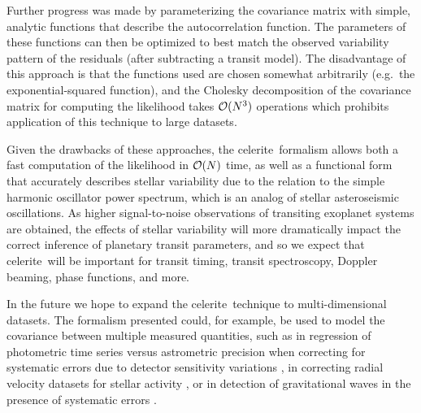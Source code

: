 \documentclass[manuscript, letterpaper]{aastex6}
\newcommand{\project}[1]{\textsf{#1}}
\newcommand{\celerite}{\project{celerite}}
\begin{document}
Further progress was made by parameterizing the covariance matrix with simple,
analytic functions that describe the autocorrelation function.  The parameters
of these functions can then be optimized to best match the observed variability
pattern of the residuals (after subtracting a transit model).  The disadvantage of
this approach is that the functions used are chosen somewhat arbitrarily (e.g.\
the exponential-squared function), and the Cholesky decomposition of the covariance
matrix for computing the likelihood takes ${\cal O}(N^3)$ operations which prohibits
application of this technique to large datasets.

Given the drawbacks of these approaches, the \celerite\ formalism allows both a fast
computation of the likelihood in ${\cal O}(N)$ time, as well as a functional form
that accurately describes stellar variability due to the relation to the simple
harmonic oscillator power spectrum, which is an analog of stellar asteroseismic
oscillations.  As higher signal-to-noise observations of transiting exoplanet systems
are obtained, the effects of stellar variability will more dramatically impact the
correct inference of planetary transit parameters, and so we expect that \celerite\
will be important for transit timing, transit spectroscopy, Doppler beaming,
phase functions, and more.

In the future we hope to expand the \celerite\ technique to multi-dimensional
datasets.  The formalism presented could, for example, be used to model
the covariance between multiple measured quantities, such as in regression of photometric
time series versus astrometric precision when correcting for systematic errors
due to detector sensitivity variations \citep{Aigrain:2016}, in correcting
radial velocity datasets for stellar activity \citep{Haywood:2014,Rajpaul:2015},
or in detection of gravitational waves in the presence of systematic errors
\citep{Moore:2016}.
\end{document}
